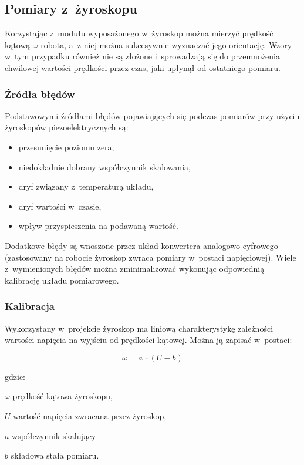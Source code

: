 \subsection{Pomiary z~żyroskopu}

Korzystając z~modułu wyposażonego w~żyroskop można mierzyć prędkość kątową
$\omega$ robota, a~z niej można sukcesywnie wyznaczać jego orientację. Wzory 
w~tym przypadku również nie są złożone i~sprowadzają się do przemnożenia chwilowej
wartości prędkości przez czas, jaki upłynął od ostatniego pomiaru.

\subsubsection{Źródła błędów}

Podstawowymi źródłami błędów pojawiających się podczas pomiarów przy użyciu
żyroskopów piezoelektrycznych są:

\begin{itemize}
  \item przesunięcie poziomu zera,
  \item niedokładnie dobrany współczynnik skalowania,
  \item dryf związany z~temperaturą układu,
  \item dryf wartości w~czasie,
  \item wpływ przyspieszenia na podawaną wartość.
\end{itemize}

Dodatkowe błędy są wnoszone przez układ konwertera analogowo-cyfrowego
(zastosowany na robocie żyroskop zwraca pomiary w~postaci napięciowej).
Wiele z~wymienionych błędów można zminimalizować wykonując odpowiednią
kalibrację układu pomiarowego.

\subsubsection{Kalibracja}

Wykorzystany w~projekcie żyroskop ma liniową charakterystykę zależności
wartości napięcia na wyjściu od prędkości kątowej. Można ją zapisać w~postaci:

\[
\omega = a~\cdot (U - b)
\]

gdzie:

\begin{mydescription}{5pt}
\item[$\omega$] prędkość kątowa żyroskopu,
\item[$U$] wartość napięcia zwracana przez żyroskop,
\item[$a$] współczynnik skalujący
\item[$b$] składowa stała pomiaru.
\end{mydescription}

